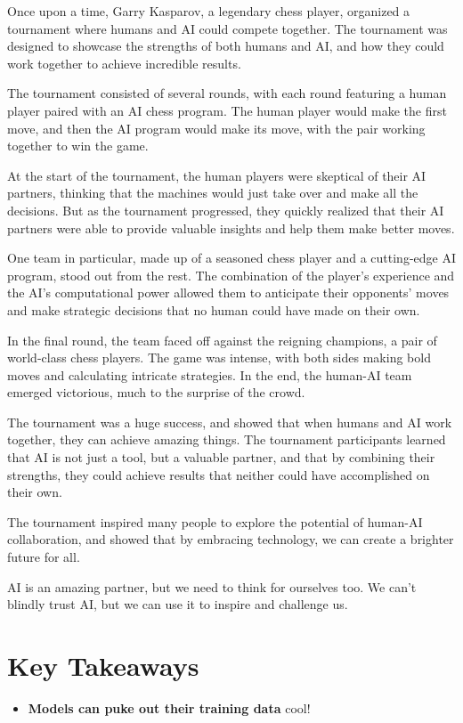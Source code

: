 Once upon a time, Garry Kasparov, a legendary chess player, organized a tournament where humans and AI could compete together. The tournament was designed to showcase the strengths of both humans and AI, and how they could work together to achieve incredible results.

The tournament consisted of several rounds, with each round featuring a human player paired with an AI chess program. The human player would make the first move, and then the AI program would make its move, with the pair working together to win the game.

At the start of the tournament, the human players were skeptical of their AI partners, thinking that the machines would just take over and make all the decisions. But as the tournament progressed, they quickly realized that their AI partners were able to provide valuable insights and help them make better moves.

One team in particular, made up of a seasoned chess player and a cutting-edge AI program, stood out from the rest. The combination of the player's experience and the AI's computational power allowed them to anticipate their opponents' moves and make strategic decisions that no human could have made on their own.

In the final round, the team faced off against the reigning champions, a pair of world-class chess players. The game was intense, with both sides making bold moves and calculating intricate strategies. In the end, the human-AI team emerged victorious, much to the surprise of the crowd.

The tournament was a huge success, and showed that when humans and AI work together, they can achieve amazing things. The tournament participants learned that AI is not just a tool, but a valuable partner, and that by combining their strengths, they could achieve results that neither could have accomplished on their own.

The tournament inspired many people to explore the potential of human-AI collaboration, and showed that by embracing technology, we can create a brighter future for all.

AI is an amazing partner, but we need to think for ourselves too. We can't blindly trust AI, but we can use it to inspire and challenge us.

\section{Key Takeaways}

\begin{itemize}
    \item \textbf{Models can puke out their training data} cool!
\end{itemize}

